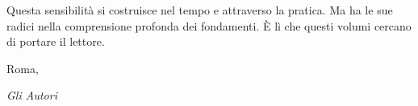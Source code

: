 Questa sensibilità si costruisce nel tempo e attraverso la pratica. Ma ha le sue radici nella comprensione profonda dei fondamenti. È lì che questi volumi cercano di portare il lettore.


\bigskip

\noindent Roma, \the\year

\noindent \textit{Gli Autori}


%
%
%
%
%
